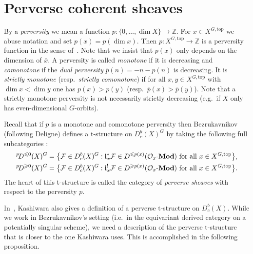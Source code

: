 \documentclass{compositio}
\theoremstyle{plain}
\theoremstyle{definition}
\theoremstyle{remark}
\newcommand\sheaf{\mathcal}
\newcommand\sO{\sheaf{O}}
\newcommand\cat{\mathbf}
\newcommand\catModules[1]{#1\text{-}\cat{Mod}}
\newcommand\perv[1][p]{\mkern1mu{}^{#1}\mkern-3mu}
\newcommand\Xtop[1][X]{#1^{G,\mathrm{top}}}
\begin{document}
\section{Perverse coherent sheaves}
\label{sec:Kashiwara}%

By a \emph{perversity} we mean a function $p\colon \{0,\dotsc,\dim X\} \to  \mathbb{Z}$.
For $x \in  \Xtop$ we abuse notation and set $p(x) = p(\dim x)$.
Then $p\colon \Xtop \to  \mathbb{Z}$ is a perversity function in the sense of~\cite{Bezrukavnikov:arXiv:PerverseCoherentSheaves}.
Note that we insist that $p(x)$ only depends on the dimension of $\overline x$.
A perversity is called \emph{monotone} if it is decreasing and \emph{comonotone} if the \emph{dual perversity} $\overline p(n) = -n - p(n)$ is decreasing.
It is \emph{strictly monotone} (resp.~\emph{strictly comonotone}) if for all $x,y \in  \Xtop$ with $\dim x < \dim y$ one has $p(x) > p(y)$ (resp.~$\overline p(x) > \overline p(y)$).
Note that a strictly monotone perversity is not necessarily strictly decreasing (e.g.~if $X$ only has even-dimensional $G$-orbits).

Recall that if $p$ is a monotone and comonotone perversity then Bezrukavnikov (following Deligne) defines a t-structure on $D_c^b(X)^G$ by taking the following full subcategories \cite{Bezrukavnikov:arXiv:PerverseCoherentSheaves,ArinkinBezrukavnikov:arXiv:PerverseCoherentSheaves}:
\begin{align*}
    \perv[p] D^{\leq 0}(X)^G & = 
    \bigl\{ \sheaf F \in  D_c^b(X)^G : \mathbf i_x^*\sheaf F \in  D^{\leq p(x)}(\catModules{\sO_x}) \text{ for all $x \in  \Xtop$}\bigr\}, \\
    \perv[p] D^{\geq 0}(X)^G & = 
    \bigl\{ \sheaf F \in  D_c^b(X)^G : \mathbf i_x^!\sheaf F \in  D^{\geq p(x)}(\catModules{\sO_x}) \text{ for all $x \in  \Xtop$}\bigr\}.
\end{align*}
The heart of this t-structure is called the category of \emph{perverse sheaves} with respect to the perversity $p$.

In~\cite{Kashiwara:2004:tStructureOnHolonomicDModuleCoherentOModules}, Kashiwara also gives a definition of a perverse t-structure on $D^b_{c}(X)$.
While we work in Bezrukavnikov's setting (i.e.\ in the equivariant derived category on a potentially singular scheme), we need a description of the perverse t-structure that is closer to the one Kashiwara uses.
This is accomplished in the following proposition.
\end{document}
